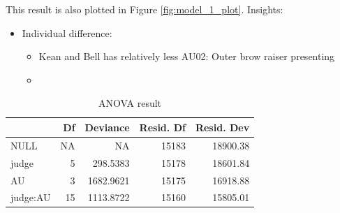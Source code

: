 \documentclass{monashthesis}
\begin{document}
This result is also plotted in Figure \ref{fig:model_1_plot}. Insights:

\begin{itemize}
\tightlist
\item
  Individual difference:

  \begin{itemize}
  \item
    Kean and Bell has relatively less AU02: Outer brow raiser presenting
  \item
  \end{itemize}
\end{itemize}

\begin{table}[t]

\caption{\label{tab:anova}\label{tab:anova}ANOVA result}
\centering
\begin{tabular}{l|r|r|r|r}
\hline
  & Df & Deviance & Resid. Df & Resid. Dev\\
\hline
NULL & NA & NA & 15183 & 18900.38\\
\hline
judge & 5 & 298.5383 & 15178 & 18601.84\\
\hline
AU & 3 & 1682.9621 & 15175 & 16918.88\\
\hline
judge:AU & 15 & 1113.8722 & 15160 & 15805.01\\
\hline
\end{tabular}
\end{table}
\end{document}
